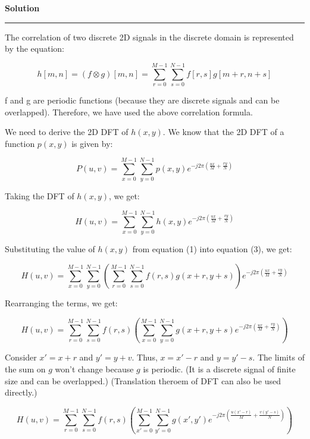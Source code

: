 \documentclass[a4paper]{article}
\newenvironment{solution}[2][]{%
    \begin{mdframed}[linecolor=green!60!black, linewidth=2pt, roundcorner=10pt, backgroundcolor=green!5!white, skipabove=12pt, skipbelow=12pt]%
        \textbf{\large #2} %
        \par\noindent\rule{\textwidth}{0.4pt} %
        \vspace{0.5em} %
}{%
    \end{mdframed}%
}
\begin{document}
\begin{solution}{Solution}
The correlation of two discrete 2D signals in the discrete domain is represented by the equation:

\begin{equation}
    h[m, n] = (f \otimes g)[m, n] = \sum_{r=0}^{M-1} \sum_{s=0}^{N-1} f[r, s]g[m+r, n+s]
\end{equation}


f and g are periodic functions (because they are discrete signals and can be overlapped). Therefore, we have used the above correlation formula.


We need to derive the 2D DFT of $h(x, y)$. We know that the 2D DFT of a function $p(x, y)$ is given by: 

\begin{equation}
    P(u, v) = \sum_{x = 0}^{M-1} \sum_{y = 0}^{N-1} p(x, y) e^{-j2\pi(\frac{ux}{M}+\frac{vy}{N})} 
\end{equation}

Taking the DFT of $h(x, y)$, we get:

\begin{equation}
    H(u, v) = \sum_{x = 0}^{M-1} \sum_{y = 0}^{N-1} h(x, y) e^{-j2\pi(\frac{ux}{M}+\frac{vy}{N})} 
\end{equation}

Substituting the value of $h(x, y)$ from equation (1) into equation (3), we get:

\begin{equation}
    H(u, v) = \sum_{x = 0}^{M-1} \sum_{y = 0}^{N-1} \left( \sum_{r = 0}^{M-1} \sum_{s = 0}^{N-1} f(r, s)g(x+r, y+s)\right) e^{-j2\pi(\frac{ux}{M}+\frac{vy}{N})} 
\end{equation}

Rearranging the terms, we get:

\begin{equation}
    H(u, v) = \sum_{r = 0}^{M-1} \sum_{s = 0}^{N-1} f(r, s)\left( \sum_{x = 0}^{M-1} \sum_{y = 0}^{N-1} g(x+r, y+s) e^{-j2\pi(\frac{ux}{M}+\frac{vy}{N})}\right)  
\end{equation}


Consider $x' = x + r$ and $y' = y + v$. Thus, $x = x' - r$ and $y = y' - s$. The limits of the sum on $g$ won't change because $g$ is periodic. (It is a discrete signal of finite size and can be overlapped.) (Translation theroem of DFT can also be used directly.)

\begin{equation}
    H(u, v) = \sum_{r = 0}^{M-1} \sum_{s = 0}^{N-1} f(r, s)\left( \sum_{x' = 0}^{M-1} \sum_{y' = 0}^{N-1} g(x', y') e^{-j2\pi(\frac{u(x'-r)}{M}+\frac{v(y'-s)}{N})}\right)
\end{equation}


\end{solution}
\end{document}
